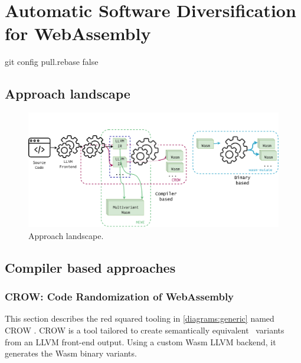 \chapter{Automatic Software Diversification for WebAssembly}
\label{tech}
git config pull.rebase false
\setcounter{subsection}{0}

\section{Approach landscape}

\begin{figure}[h]
	\centering
	\includegraphics[width=1.0\textwidth]{figures/landscape.pdf}
	\caption{Approach landscape.}
	\label{fig:approach_landscape}
\end{figure}

\section{Compiler based approaches}

\subsection{CROW: Code Randomization of WebAssembly}
\label{section:crow}

This section describes the red squared tooling in \autoref{diagrams:generic} named CROW  \cite{CROW}. CROW is a tool tailored to create semantically equivalent \wasm\ variants from an LLVM front-end output.
Using a custom Wasm LLVM backend, it generates the Wasm binary variants.


